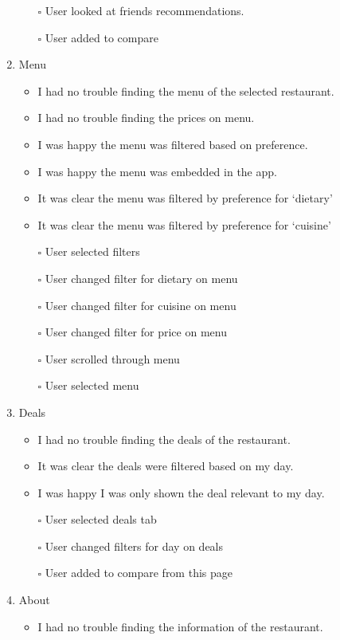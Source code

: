 \documentclass[a4 paper, 10pt]{article}
\begin{document}
\begin{multicols}{2}
\begin{enumerate}
\begin{itemize}
                    \item[$\square$] User looked at friends recommendations.
                    \item[$\square$] User added to compare
                \end{itemize}
            \item Menu
                \begin{itemize}
                    \item I had no trouble finding the menu of the selected restaurant.
                    \item I had no trouble finding the prices on menu.
                    \item I was happy the menu was filtered based on preference.
                    \item I was happy  the menu was embedded in the app.
                    \item It was clear the menu was filtered by preference for ‘dietary’
                    \item It was clear the menu was filtered by preference for ‘cuisine’
                    
                    \item[$\square$] User selected filters
                    \item[$\square$] User changed filter for dietary on menu
                    \item[$\square$] User changed filter for cuisine on menu
                    \item[$\square$] User changed filter for price on menu
                    \item[$\square$] User scrolled through menu
                    \item[$\square$] User selected menu
                \end{itemize}
            \item Deals
                \begin{itemize}
                    \item I had no trouble finding the deals of the restaurant.
                    \item It was clear the deals were filtered based on my day.
                    \item I was happy I was only shown the deal relevant to my day.
                    
                    \item[$\square$] User selected deals tab
                    \item[$\square$] User changed filters for day on deals
                    \item[$\square$] User added to compare from this page
                \end{itemize}
            \item About
                \begin{itemize}
                    \item I had no trouble finding the information of the restaurant.
                    

\end{itemize}
\end{enumerate}
\end{multicols}
\end{document}
